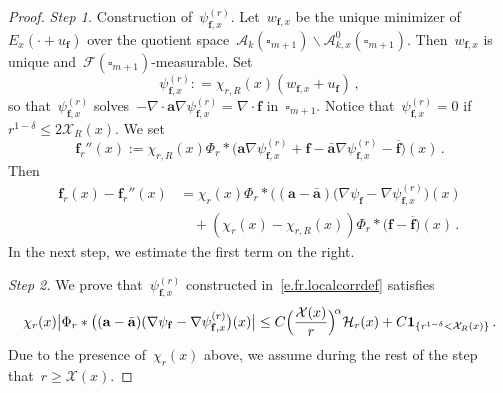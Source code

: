 \documentclass[11pt,twoside]{article} %
\let\oldsquare\square %
\renewcommand{\square}{\oldsquare}
\numberwithin{equation}{section}
\theoremstyle{definition}
\newcommand{\f}{\mathbf{f}}
\renewcommand{\a}{\mathbf{a}}
\newcommand{\ahom}{\bar{\a}}
\newcommand{\cu}{\square}
\newcommand{\F}{\mathcal{F}}
\newcommand{\X}{\mathcal{X}}
\newcommand{\indc}{\boldsymbol{1}}
\newcommand{\minscale}{\chi}
\newcommand{\A}{\mathcal{A}}
\begin{document}
\begin{proof}
\emph{Step 1.} Construction of~$\psi_{\f,x}^{(r)}$.  Let~$w_{\f,x}$ be the unique minimizer of~$E_x(\cdot + u_{\f})$ over the quotient space~$\A_{k}(\cu_{m+1}) \backslash \A_{k,x}^0(\cu_{m+1})$.  Then~$w_{\f,x}$ is unique and~$\F(\cu_{m+1})$-measurable.  Set 
\begin{equation}  \label{e.fr.localcorrdef}
\psi_{\f,x}^{(r)}  : = \minscale_{r,R}(x)( w_{\f,x} + u_{\f}) 
\,,
\end{equation}
so that~$\psi_{\f,x}^{(r)}$ solves~$-\nabla \cdot \a \nabla \psi_{\f,x}^{(r)}  = \nabla \cdot \f$ in~$\cu_{m+1}$. Notice that~$\psi_{\f,x}^{(r)} = 0$ if~$r^{1-\delta} \leq 2\X_{R}(x)$. We set
\begin{equation*}  
\f_{r}''(x) 
:= 
\minscale_{r,R}(x) \Phi_r \ast  \bigl( \a \nabla \psi_{\f,x}^{(r)}  + \f - \ahom \nabla \psi_{\f,x}^{(r)} - \overline{\f}  \bigr) (x) \,.
\end{equation*}
Then
\begin{align*}  
\f_r(x) - \f_{r}''(x)
& = 
\minscale_{r}(x) \Phi_r \ast  \bigl( (\a - \ahom)( \nabla \psi_{\f}  -  \nabla \psi_{\f,x}^{(r)}  \bigr) (x) 
\\ & \quad 
+ 
(\minscale_{r}(x)-\minscale_{r,R}(x)) \Phi_r \ast  \bigl( \f - \overline{\f}  \bigr) (x)\,.
\end{align*}
In the next step, we estimate the first term on the right. 


\smallskip

\emph{Step 2.} We prove that~$\psi_{\f,x}^{(r)}$ constructed in~\eqref{e.fr.localcorrdef} satisfies
\begin{equation}  \label{e.fr.correctorloc.pre}
\minscale_{r}(x) 
\bigl| 
\Phi_r \ast  \bigl( (\a - \ahom)( \nabla \psi_{\f}  -  \nabla \psi_{\f,x}^{(r)}  \bigr) (x) 
\bigr| 
\\ 
\leq
C \Bigl( \frac{\X(x)}{r} \Bigr)^{\! \alpha}  \mathcal{H}_r(x) 
+ C  \indc_{\{ r^{1-\delta} < \X_{R}(x) \}}
\,.
\end{equation}
Due to the presence of~$\minscale_{r}(x)$ above, we assume during the rest of the step that~$r \geq \X(x)$. 

\smallskip


\end{proof}
\end{document}
